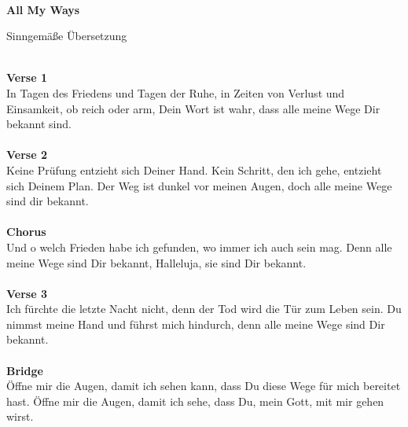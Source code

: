 \mbox{}\\
\huge\centerline{\textbf{All My Ways}}
\normalsize \centerline{Sinngemäße Übersetzung}
\mbox{}\\
\textbf{Verse 1}\\
In Tagen des Friedens und Tagen der Ruhe, in Zeiten von Verlust und Einsamkeit, ob reich oder arm, Dein Wort ist wahr, dass alle meine Wege Dir bekannt sind.\\
\\
\textbf{Verse 2}\\
Keine Prüfung entzieht sich Deiner Hand. Kein Schritt, den ich gehe, entzieht sich Deinem Plan. Der Weg ist dunkel vor meinen Augen, doch alle meine Wege sind dir bekannt.\\
\\
\textbf{Chorus}\\
Und o welch Frieden habe ich gefunden, wo immer ich auch sein mag. Denn alle meine Wege sind Dir bekannt, Halleluja, sie sind Dir bekannt.\\
\\
\textbf{Verse 3}\\
Ich fürchte die letzte Nacht nicht, denn der Tod wird die Tür zum Leben sein. Du nimmst meine Hand und führst mich hindurch, denn alle meine Wege sind Dir bekannt.\\
\\
\textbf{Bridge}\\
Öffne mir die Augen, damit ich sehen kann, dass Du diese Wege für mich bereitet hast. Öffne mir die Augen, damit ich sehe, dass Du, mein Gott, mit mir gehen wirst.


